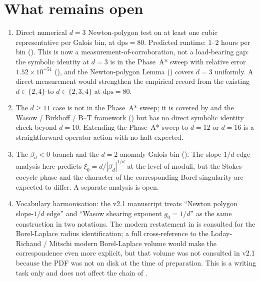 \documentclass[11pt,reqno]{amsart}
\theoremstyle{plain}
\theoremstyle{definition}
\theoremstyle{remark}
\newcommand{\dps}{\mathrm{dps}}
\begin{document}
\section{What remains open}
\label{sec:open}

\begin{enumerate}[label=(\alph*),leftmargin=2.2em]

\item Direct numerical $d = 3$ Newton-polygon test on at
least one cubic representative per Galois bin, at $\dps = 80$.
Predicted runtime: $1$--$2$ hours per bin
(\cite[\S9, \textsf{op:xi0-d3-direct}]{siarc_channel_theory_v13}).
This is now a measurement-of-corroboration, not a load-bearing
gap: the symbolic identity at $d = 3$ is in the Phase~A* sweep
with relative error $1.52\times 10^{-51}$
(), and the Newton-polygon Lemma
() covers $d = 3$ uniformly. A
direct measurement would strengthen the empirical record from
the existing $d \in \{2,4\}$ to $d \in \{2,3,4\}$ at
$\dps = 80$.

\item The $d \ge 11$ case is not in the Phase~A* sweep; it is
covered by  and the Wasow / Birkhoff
/ B--T framework () but has no direct
symbolic identity check beyond $d = 10$. Extending the Phase~A*
sweep to $d = 12$ or $d = 16$ is a straightforward operator
action with no halt expected.

\item The $\beta_d < 0$ branch and the $d = 2$ anomaly
Galois bin (\cite[Remark~5.E]{siarc_pcf1_v13}). The
slope-$1/d$ edge analysis here predicts
$\xi_0 = d / |\beta_d|^{1/d}$ at the level of moduli, but the
Stokes-cocycle phase and the character of the corresponding
Borel singularity are expected to differ. A separate analysis
is open.

\item Vocabulary harmonisation: the v2.1 manuscript treats
``Newton polygon slope-$1/d$ edge'' and ``Wasow shearing
exponent $g_0 = 1/d$'' as the same construction in two
notations. The modern restatement in
\cite[ch.~5]{costin2008asymptotics} is consulted for the
Borel-Laplace radius identification; a full cross-reference
to the Loday-Richaud / Mitschi modern Borel-Laplace volume
would make the correspondence even more explicit, but that
volume was not consulted in v2.1 because the PDF was not on
disk at the time of preparation. This is a writing task
only and does not affect the chain of .

\end{enumerate}
\end{document}
